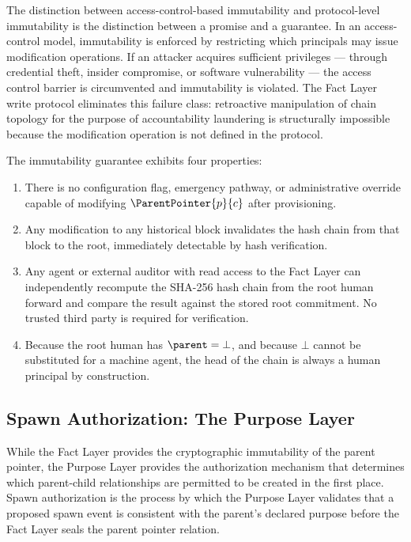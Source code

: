 The distinction between access-control-based immutability and protocol-level immutability is the distinction between a promise and a guarantee. In an access-control model, immutability is enforced by restricting which principals may issue modification operations. If an attacker acquires sufficient privileges — through credential theft, insider compromise, or software vulnerability — the access control barrier is circumvented and immutability is violated. The Fact Layer write protocol eliminates this failure class: retroactive manipulation of chain topology for the purpose of accountability laundering is structurally impossible because the modification operation is not defined in the protocol.

The immutability guarantee exhibits four properties:

\begin{enumerate}
    \item[(E1) \textbf{No override path.}] There is no configuration flag, emergency pathway, or administrative override capable of modifying $\ParentPointer{p}{c}$ after provisioning.
    \item[(E2) \textbf{Cryptographic binding.}] Any modification to any historical block invalidates the hash chain from that block to the root, immediately detectable by hash verification.
    \item[(E3) \textbf{Agent-self-verifying.}] Any agent or external auditor with read access to the Fact Layer can independently recompute the SHA-256 hash chain from the root human forward and compare the result against the stored root commitment. No trusted third party is required for verification.
    \item[(E4) \textbf{Human-grounded.}] Because the root human has $\parent = \bot$, and because $\bot$ cannot be substituted for a machine agent, the head of the chain is always a human principal by construction.
\end{enumerate}

\subsection{Spawn Authorization: The Purpose Layer}
\label{sec:purpose_layer_authorization}

While the Fact Layer provides the cryptographic immutability of the parent pointer, the Purpose Layer provides the authorization mechanism that determines which parent-child relationships are permitted to be created in the first place. Spawn authorization is the process by which the Purpose Layer validates that a proposed spawn event is consistent with the parent's declared purpose before the Fact Layer seals the parent pointer relation.

